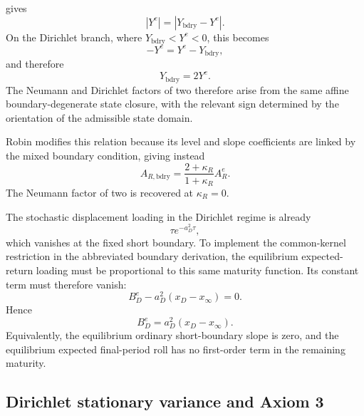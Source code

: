 \documentclass[12pt]{article}
\numberwithin{equation}{subsection}
\begin{document}
gives
\begin{equation}
\left|Y^e\right|
=
\left|Y_{\mathrm{bdry}}-Y^e\right|.
\end{equation}
On the Dirichlet branch, where $Y_{\mathrm{bdry}}<Y^e<0$, this becomes
\begin{equation}
-Y^e=Y^e-Y_{\mathrm{bdry}},
\end{equation}
and therefore
\begin{equation}
Y_{\mathrm{bdry}}=2Y^e.
\end{equation}
The Neumann and Dirichlet factors of two therefore arise from the same affine boundary-degenerate state closure, with the relevant sign determined by the orientation of the admissible state domain.

Robin modifies this relation because its level and slope coefficients are linked by the mixed boundary condition, giving instead
\begin{equation}
A_{R,\mathrm{bdry}}
=
\frac{2+\kappa_R}{1+\kappa_R}A_R^e.
\end{equation}
The Neumann factor of two is recovered at $\kappa_R=0$.

The stochastic displacement loading in the Dirichlet regime is already
\[
\tau e^{-a_D^2\tau},
\]
which vanishes at the fixed short boundary. To implement the common-kernel restriction in the abbreviated boundary derivation, the equilibrium expected-return loading must be proportional to this same maturity function. Its constant term must therefore vanish:
\[
B_D^e-a_D^2(x_D-x_\infty)=0.
\]
Hence
\[
B_D^e=a_D^2(x_D-x_\infty).
\]
Equivalently, the equilibrium ordinary short-boundary slope is zero, and the equilibrium expected final-period roll has no first-order term in the remaining maturity.


\subsection{Dirichlet stationary variance and Axiom 3}
\end{document}
